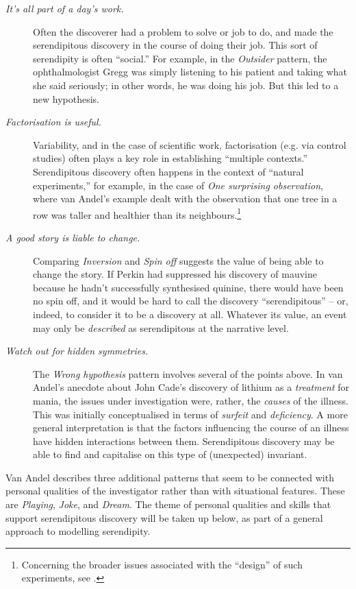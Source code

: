 \documentclass{llncs}
\begin{document}
\begin{description}
\item[\emph{It's all part of a day's work.}] Often the discoverer had
  a problem to solve or job to do, and made the serendipitous
  discovery in the course of doing their job.  This sort of
  serendipity is often ``social.''  For example, in the
  \emph{Outsider} pattern, the ophthalmologist Gregg was simply
  listening to his patient and taking what she said seriously; in
  other words, he was doing his job.  But this led to a new
  hypothesis.
\item[\emph{Factorisation is useful.}] Variability, and in the case of
  scientific work, factorisation (e.g. via control studies) often
  plays a key role in establishing ``multiple contexts.''
  Serendipitous discovery often happens in the context of ``natural
  experiments,'' for example, in the case of \emph{One surprising
    observation}, where van Andel's example dealt with the observation
  that one tree in a row was taller and healthier than its
  neighbours.\footnote{Concerning the broader issues associated with
    the ``design'' of such experiments, see
    \cite{imbens1994identification}.}
\item[\emph{A good story is liable to change.}] Comparing
  \emph{Inversion} and \emph{Spin off} suggests the value of being
  able to change the story.  If Perkin had suppressed his discovery of
  mauvine because he hadn't successfully synthesised quinine, there
  would have been no spin off, and it would be hard to call the
  discovery ``serendipitous'' -- or, indeed, to consider it to be a
  discovery at all.  Whatever its value, an event may only be
  \emph{described} as serendipitous at the narrative level.
\item[\emph{Watch out for hidden symmetries.}] The \emph{Wrong
  hypothesis} pattern involves several of the points above.  In van
  Andel's anecdote about John Cade's discovery of lithium as a
  \emph{treatment} for mania, the issues under investigation were,
  rather, the \emph{causes} of the illness.  This was initially
  conceptualised in terms of \emph{surfeit} and \emph{deficiency}.  A
  more general interpretation is that the factors influencing the
  course of an illness have hidden interactions between them.
  Serendipitous discovery may be able to find and capitalise on this
  type of (unexpected) invariant.
\end{description}

Van Andel describes three additional patterns that seem to be
connected with personal qualities of the investigator rather than with
situational features.  These are \emph{Playing}, \emph{Joke}, and
\emph{Dream}.  The theme of personal qualities and skills that support
serendipitous discovery will be taken up below, as part of a general
approach to modelling serendipity.
\end{document}
